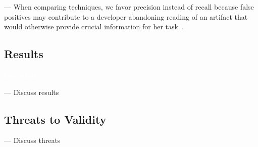 \vspace{3mm}

--- When comparing techniques, we favor precision instead of recall because false positives may contribute to a developer abandoning reading of an artifact that would otherwise provide crucial information for her task~\cite{Rastkar2010}.


\subsection{Results}
\textcolor{white}{force ident} %

--- Discuss results \vspace{3mm}

\subsection{Threats to Validity}

--- Discuss threats \vspace{3mm}





